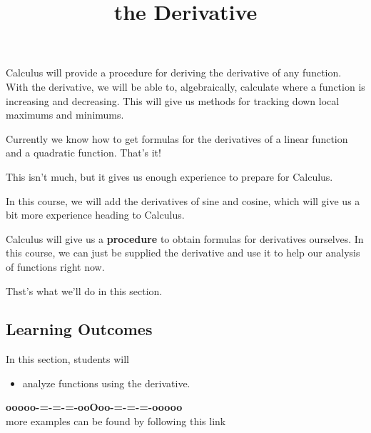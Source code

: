 \documentclass{ximera}
\title{the Derivative}
\begin{document}
\begin{abstract}
%
\end{abstract}
\maketitle




Calculus will provide a procedure for deriving the derivative of any function.  With the derivative, we will be able to, algebraically, calculate where a function is increasing and decreasing.  This will give us methods for tracking down local maximums and minimums.


Currently we know how to get formulas for the derivatives of a linear function and a quadratic function.  That's it! 

This isn't much, but it gives us enough experience to prepare for Calculus.


In this course, we will add the derivatives of sine and cosine, which will give us a bit more experience heading to Calculus.


Calculus will give us a \textbf{\textcolor{blue!55!black}{procedure}} to obtain formulas for derivatives ourselves.  In this course, we can just be supplied the derivative and use it to help our analysis of functions right now.


Thst's what we'll do in this section.






\subsection*{Learning Outcomes}


\begin{sectionOutcomes}
In this section, students will 

\begin{itemize}
\item analyze functions using the derivative.
\end{itemize}
\end{sectionOutcomes}













\begin{center}
\textbf{\textcolor{green!50!black}{ooooo-=-=-=-ooOoo-=-=-=-ooooo}} \\

more examples can be found by following this link\\ 

\end{center}
\end{document}
